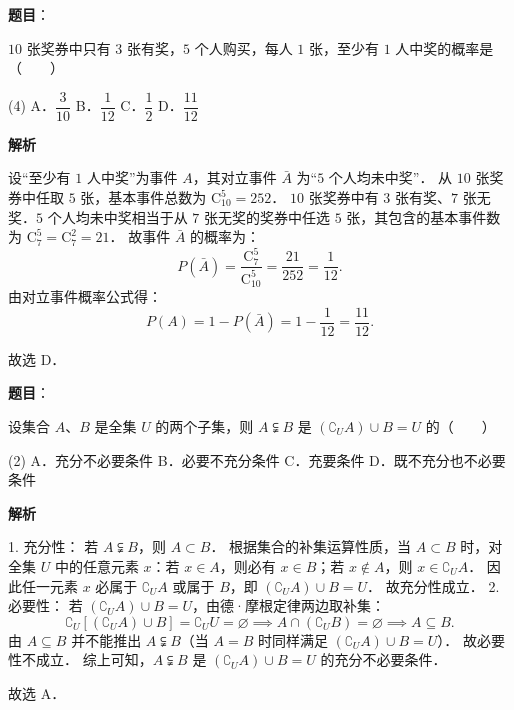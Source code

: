 \begin{answer}

\textbf{题目}：

$10$ 张奖券中只有 $3$ 张有奖，$5$ 个人购买，每人 $1$ 张，至少有 $1$ 人中奖的概率是\mbox{（　　）}

\begin{gkopts}(4)
\task A．$\dfrac{3}{10}$
\task B．$\dfrac{1}{12}$
\task C．$\dfrac{1}{2}$
\task D．$\dfrac{11}{12}$
\end{gkopts}

\textbf{解析}

设“至少有 $1$ 人中奖”为事件 $A$，其对立事件 $\bar{A}$ 为“$5$ 个人均未中奖”．
从 $10$ 张奖券中任取 $5$ 张，基本事件总数为 $\mathrm{C}_{10}^5 = 252$．
$10$ 张奖券中有 $3$ 张有奖、$7$ 张无奖．$5$ 个人均未中奖相当于从 $7$ 张无奖的奖券中任选 $5$ 张，其包含的基本事件数为 $\mathrm{C}_7^5 = \mathrm{C}_7^2 = 21$．
故事件 $\bar{A}$ 的概率为：
\nopagebreak[4]
\[
P(\bar{A}) = \dfrac{\mathrm{C}_7^5}{\mathrm{C}_{10}^5} = \dfrac{21}{252} = \dfrac{1}{12}.
\]
由对立事件概率公式得：
\nopagebreak[4]
\[
P(A) = 1 - P(\bar{A}) = 1 - \dfrac{1}{12} = \dfrac{11}{12}.
\]

故选 D．


\end{answer}
\begin{answer}

\textbf{题目}：

设集合 $A$、$B$ 是全集 $U$ 的两个子集，则 $A \subsetneqq B$ 是 $(\complement_U A) \cup B = U$ 的\mbox{（　　）}

\begin{gkopts}(2)
\task A．充分不必要条件
\task B．必要不充分条件
\task C．充要条件
\task D．既不充分也不必要条件
\end{gkopts}

\textbf{解析}

1. 充分性：
若 $A \subsetneqq B$，则 $A \subset B$．
根据集合的补集运算性质，当 $A \subset B$ 时，对全集 $U$ 中的任意元素 $x$：若 $x \in A$，则必有 $x \in B$；若 $x \notin A$，则 $x \in \complement_U A$．
因此任一元素 $x$ 必属于 $\complement_U A$ 或属于 $B$，即 $(\complement_U A) \cup B = U$．
故充分性成立．
2. 必要性：
若 $(\complement_U A) \cup B = U$，由德·摩根定律两边取补集：
\nopagebreak[4]
\[
\complement_U [(\complement_U A) \cup B] = \complement_U U = \varnothing \implies A \cap (\complement_U B) = \varnothing \implies A \subseteq B.
\]
由 $A \subseteq B$ 并不能推出 $A \subsetneqq B$（当 $A = B$ 时同样满足 $(\complement_U A) \cup B = U$）．
故必要性不成立．
综上可知，$A \subsetneqq B$ 是 $(\complement_U A) \cup B = U$ 的充分不必要条件．

故选 A．


\end{answer}

